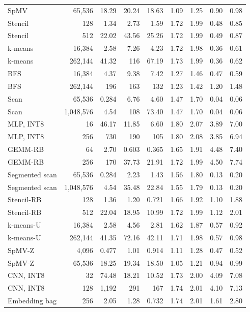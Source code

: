 \begin{table}[p]
\begin{tabular}{lrrrrrrrr}
SpMV & 65{,}536 & 18.29 & 20.24 & 18.63 & 1.09 & 1.25 & 0.90 & 0.98\\
Stencil & 128 & 1.34 & 2.73 & 1.59 & 1.72 & 1.99 & 0.48 & 0.85\\
Stencil & 512 & 22.02 & 43.56 & 25.26 & 1.72 & 1.99 & 0.49 & 0.87\\
k-means & 16{,}384 & 2.58 & 7.26 & 4.23 & 1.72 & 1.98 & 0.36 & 0.61\\
k-means & 262{,}144 & 41.32 & 116 & 67.19 & 1.73 & 1.99 & 0.36 & 0.62\\
BFS & 16{,}384 & 4.37 & 9.38 & 7.42 & 1.27 & 1.46 & 0.47 & 0.59\\
BFS & 262{,}144 & 196 & 163 & 132 & 1.23 & 1.42 & 1.20 & 1.48\\
Scan & 65{,}536 & 0.284 & 6.76 & 4.60 & 1.47 & 1.70 & 0.04 & 0.06\\
Scan & 1{,}048{,}576 & 4.54 & 108 & 73.40 & 1.47 & 1.70 & 0.04 & 0.06\\
MLP{,} INT8 & 16 & 46.17 & 11.85 & 6.60 & 1.80 & 2.07 & 3.89 & 7.00\\
MLP{,} INT8 & 256 & 730 & 190 & 105 & 1.80 & 2.08 & 3.85 & 6.94\\
GEMM-RB & 64 & 2.70 & 0.603 & 0.365 & 1.65 & 1.91 & 4.48 & 7.40\\
GEMM-RB & 256 & 170 & 37.73 & 21.91 & 1.72 & 1.99 & 4.50 & 7.74\\
Segmented scan & 65{,}536 & 0.284 & 2.23 & 1.43 & 1.56 & 1.80 & 0.13 & 0.20\\
Segmented scan & 1{,}048{,}576 & 4.54 & 35.48 & 22.84 & 1.55 & 1.79 & 0.13 & 0.20\\
Stencil-RB & 128 & 1.36 & 1.20 & 0.721 & 1.66 & 1.92 & 1.10 & 1.88\\
Stencil-RB & 512 & 22.04 & 18.95 & 10.99 & 1.72 & 1.99 & 1.12 & 2.01\\
k-means-U & 16{,}384 & 2.58 & 4.56 & 2.81 & 1.62 & 1.87 & 0.57 & 0.92\\
k-means-U & 262{,}144 & 41.35 & 72.16 & 42.11 & 1.71 & 1.98 & 0.57 & 0.98\\
SpMV-Z & 4{,}096 & 0.477 & 1.01 & 0.914 & 1.11 & 1.28 & 0.47 & 0.52\\
SpMV-Z & 65{,}536 & 18.25 & 19.34 & 18.50 & 1.05 & 1.21 & 0.94 & 0.99\\
CNN{,} INT8 & 32 & 74.48 & 18.21 & 10.52 & 1.73 & 2.00 & 4.09 & 7.08\\
CNN{,} INT8 & 128 & 1{,}192 & 291 & 167 & 1.74 & 2.01 & 4.10 & 7.13\\
Embedding bag & 256 & 2.05 & 1.28 & 0.732 & 1.74 & 2.01 & 1.61 & 2.80\\

\end{tabular}
\end{table}
